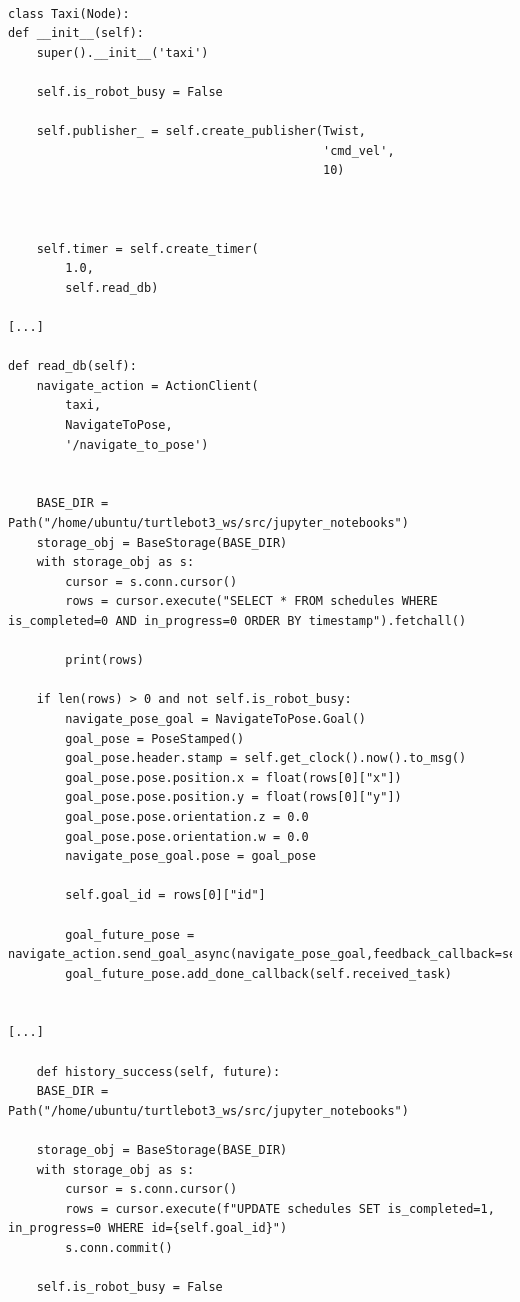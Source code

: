 \documentclass[12pt]{article}
\begin{document}
\begin{lstlisting}

class Taxi(Node):
def __init__(self): 
    super().__init__('taxi')

    self.is_robot_busy = False
    
    self.publisher_ = self.create_publisher(Twist, 
                                            'cmd_vel',
                                            10)
    


    self.timer = self.create_timer(
        1.0,
        self.read_db)

[...]

def read_db(self):
    navigate_action = ActionClient(
        taxi, 
        NavigateToPose,
        '/navigate_to_pose')


    BASE_DIR = Path("/home/ubuntu/turtlebot3_ws/src/jupyter_notebooks")
    storage_obj = BaseStorage(BASE_DIR)
    with storage_obj as s:
        cursor = s.conn.cursor()
        rows = cursor.execute("SELECT * FROM schedules WHERE is_completed=0 AND in_progress=0 ORDER BY timestamp").fetchall()

        print(rows)

    if len(rows) > 0 and not self.is_robot_busy:
        navigate_pose_goal = NavigateToPose.Goal()    
        goal_pose = PoseStamped()
        goal_pose.header.stamp = self.get_clock().now().to_msg()
        goal_pose.pose.position.x = float(rows[0]["x"])
        goal_pose.pose.position.y = float(rows[0]["y"])
        goal_pose.pose.orientation.z = 0.0
        goal_pose.pose.orientation.w = 0.0
        navigate_pose_goal.pose = goal_pose

        self.goal_id = rows[0]["id"]

        goal_future_pose = navigate_action.send_goal_async(navigate_pose_goal,feedback_callback=self.print_feedback_goal)
        goal_future_pose.add_done_callback(self.received_task)


[...]

    def history_success(self, future):
    BASE_DIR = Path("/home/ubuntu/turtlebot3_ws/src/jupyter_notebooks")

    storage_obj = BaseStorage(BASE_DIR)
    with storage_obj as s:
        cursor = s.conn.cursor()
        rows = cursor.execute(f"UPDATE schedules SET is_completed=1, in_progress=0 WHERE id={self.goal_id}")
        s.conn.commit()

    self.is_robot_busy = False
    
\end{lstlisting}
\end{document}
